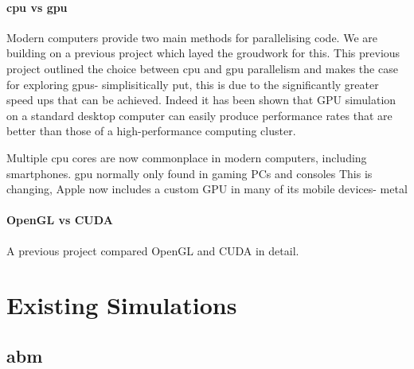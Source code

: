 \documentclass{UoYCSproject}
\begin{document}
\paragraph{\acrshort{cpu} vs \acrshort{gpu}}
Modern computers provide two main methods for parallelising code.
We are building on a previous project\cite{phil_diss} which layed the groudwork for this.
This previous project outlined the choice between \acrshort{cpu} and \acrshort{gpu} parallelism and makes the case for exploring \acrshort{gpu}s- simplisitically put, this is due to the significantly greater speed ups that can be achieved. Indeed it has been shown that GPU simulation on a standard desktop computer can easily produce performance rates that are better than those of a high-performance computing cluster\cite{flame_simulation}.

Multiple \acrshort{cpu} cores are now commonplace in modern computers, including smartphones.
\acrshort{gpu} normally only found in gaming PCs and consoles
This is changing, Apple now includes a custom GPU in many of its mobile devices- metal



\paragraph{OpenGL vs CUDA}
A previous project compared OpenGL and CUDA in detail.

\section{Existing Simulations}

\subsection{\acrlong{abm}}
\label{abm}
\end{document}
